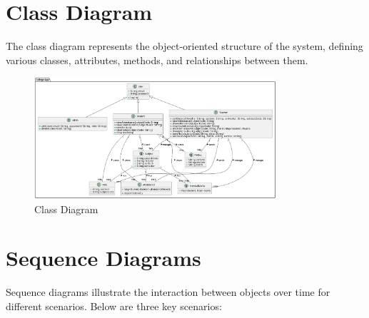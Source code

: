 \section{Class Diagram}
The class diagram represents the object-oriented structure of the system, defining various classes, attributes, methods, and relationships between them.

\begin{figure}[H]
    \centering
    \includegraphics[width=0.8\textwidth]{Graphics/class_diagram.png}
    \caption{Class Diagram}
    \label{fig:class_diagram}
\end{figure}

\section{Sequence Diagrams}
Sequence diagrams illustrate the interaction between objects over time for different scenarios. Below are three key scenarios:

